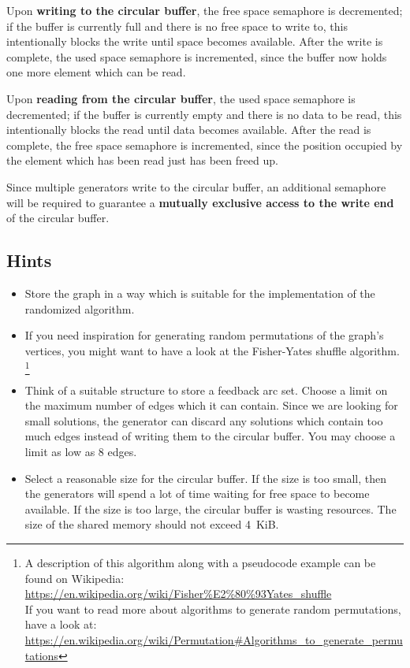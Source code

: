 Upon \textbf{writing to the circular buffer}, the free space semaphore is decremented;
if the buffer is currently full and there is no free space to write to,
this intentionally blocks the write until space becomes available.
After the write is complete, the used space semaphore is incremented,
since the buffer now holds one more element which can be read.

Upon \textbf{reading from the circular buffer}, the used space semaphore is decremented;
if the buffer is currently empty and there is no data to be read,
this intentionally blocks the read until data becomes available.
After the read is complete, the free space semaphore is incremented,
since the position occupied by the element which has been read just has been freed up.

Since multiple generators write to the circular buffer,
an additional semaphore will be required
to guarantee a \textbf{mutually exclusive access to the write end} of the circular buffer.

\subsection*{Hints}
\begin{itemize}
\item Store the graph in a way which is suitable for the implementation of the randomized algorithm.

\item If you need inspiration for generating random permutations of the graph's vertices,
you might want to have a look at the Fisher-Yates shuffle algorithm.
\footnote{
A description of this algorithm along with a pseudocode example can be found on Wikipedia:\\
\url{https://en.wikipedia.org/wiki/Fisher\%E2\%80\%93Yates_shuffle}\\
If you want to read more about algorithms to generate random permutations, have a look at:\\
\url{https://en.wikipedia.org/wiki/Permutation\#Algorithms_to_generate_permutations}
}

\item Think of a suitable structure to store a feedback arc set.
Choose a limit on the maximum number of edges which it can contain.
Since we are looking for small solutions,
the generator can discard any solutions which contain too much edges
instead of writing them to the circular buffer.
You may choose a limit as low as 8 edges.

\item Select a reasonable size for the circular buffer.
If the size is too small,
then the generators will spend a lot of time waiting for free space to become available.
If the size is too large,
the circular buffer is wasting resources.
The size of the shared memory should not exceed 4~KiB.

\end{itemize}

